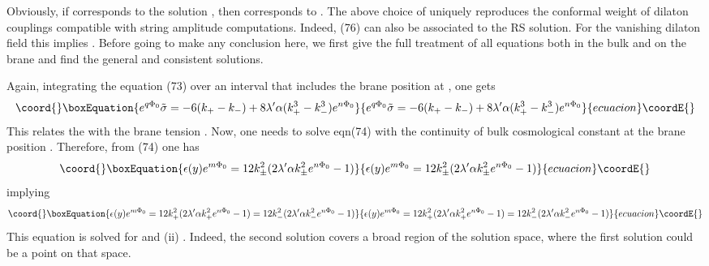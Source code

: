 \documentclass[a4paper,12pt]{article}
\begin{document}
Obviously, if \coordHE{} corresponds to the solution \coordHE{}, then \coordHE{} 
corresponds to \coordHE{}. The above choice of \coordHE{} uniquely reproduces 
the conformal weight of dilaton 
couplings compatible with string amplitude computations. Indeed, 
(76) can also be associated to the RS solution. For the vanishing dilaton 
field this implies \coordHE{}. 
Before going to make any conclusion here, we first 
give the full treatment of all equations both in the bulk and on 
the brane and find the general and consistent solutions.

Again, integrating the equation (73) over 
an interval that includes the brane position at \coordHE{}, one gets
\begin{equation}\coord{}\boxEquation{
e^{q\Phi_0}\tilde{\sigma}
=-6(k_+-k_-)+8\lambda'\alpha (k_+^3-k_-^3) e^{n\Phi_0}
}{
e^{q\Phi_0}\tilde{\sigma}
=-6(k_+-k_-)+8\lambda'\alpha (k_+^3-k_-^3) e^{n\Phi_0}
}{ecuacion}\coordE{}\end{equation}
This relates the \coordHE{} with the brane tension \myHighlight{$\tilde{\sigma}$}\coordHE{}. 
Now, one needs to solve eqn(74) with the continuity of 
bulk cosmological constant \coordHE{} at the brane 
position \coordHE{}. Therefore, from (74) one has
\begin{equation}\coord{}\boxEquation{
\epsilon(y)e^{m\Phi_0}=12k_{\pm}^2(2\lambda'\alpha k_{\pm}^2 e^{n\Phi_0}-1)
}{
\epsilon(y)e^{m\Phi_0}=12k_{\pm}^2(2\lambda'\alpha k_{\pm}^2 e^{n\Phi_0}-1)
}{ecuacion}\coordE{}\end{equation}
implying
\begin{equation}\coord{}\boxEquation{
\epsilon(y) e^{m\Phi_0}=12 k_+^2(2\lambda'\alpha k_+^2 e^{n\Phi_0}-1)
=12 k_-^2(2\lambda'\alpha k_-^2 e^{n\Phi_0}-1)
}{
\epsilon(y) e^{m\Phi_0}=12 k_+^2(2\lambda'\alpha k_+^2 e^{n\Phi_0}-1)
=12 k_-^2(2\lambda'\alpha k_-^2 e^{n\Phi_0}-1)
}{ecuacion}\coordE{}\end{equation}
This equation is solved for \coordHE{} and  
(ii) \coordHE{}. Indeed, the second 
solution covers a broad region of the solution space, 
where the first solution could be a point on that space. 
\end{document}
